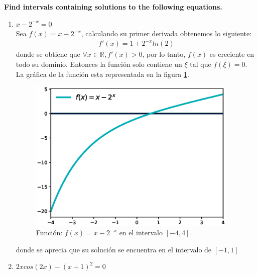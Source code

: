 \item \textbf{Find intervals containing solutions to the following equations.}
\begin{enumerate}
    \item $x-2^{-x}=0$\\
          Sea $f(x)=x-2^{-x}$, calculando su primer derivada obtenemos lo siguiente:
          \begin{align*}
              f'(x)= 1+2^{-x}ln(2)
          \end{align*}
          donde se obtiene que $\forall x  \in \mathbb{R}, f'(x)>0$, por lo tanto, $f(x)$ es creciente en todo su dominio. Entonces la función solo contiene un $\xi$ tal que $f(\xi)=0$. La gráfica de la función esta representada en la figura \ref{fig:problema1a}.
          \begin{figure}[H]
              \centering
              \includegraphics[width=10cm]{Graphics/function_1.eps}
              \caption{Función: $f(x)=x-2^{-x}$ en el intervalo $[-4,4]$.}
              \label{fig:problema1a}
          \end{figure}
          donde se aprecia que su solución se encuentra en el intervalo de $[-1,1]$
    \item $2xcos(2x)-(x+1)^2=0$\\\\


\end{enumerate}
